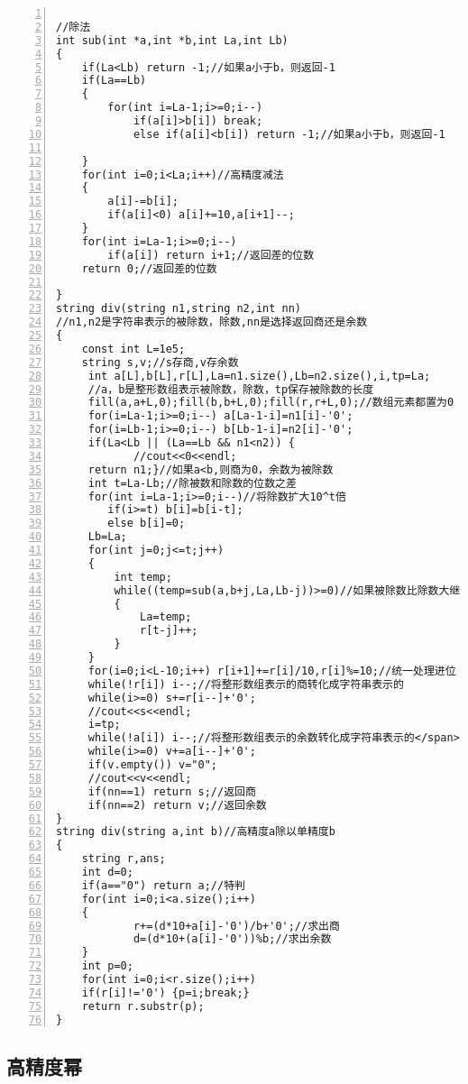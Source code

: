 \begin{lstlisting}[language={[ANSI]C},numbers=left]

//除法
int sub(int *a,int *b,int La,int Lb)
{
    if(La<Lb) return -1;//如果a小于b，则返回-1
    if(La==Lb)
    {
        for(int i=La-1;i>=0;i--)
            if(a[i]>b[i]) break;
            else if(a[i]<b[i]) return -1;//如果a小于b，则返回-1

    }
    for(int i=0;i<La;i++)//高精度减法
    {
        a[i]-=b[i];
        if(a[i]<0) a[i]+=10,a[i+1]--;
    }
    for(int i=La-1;i>=0;i--)
        if(a[i]) return i+1;//返回差的位数
    return 0;//返回差的位数

}
string div(string n1,string n2,int nn)
//n1,n2是字符串表示的被除数，除数,nn是选择返回商还是余数
{
    const int L=1e5;
    string s,v;//s存商,v存余数
     int a[L],b[L],r[L],La=n1.size(),Lb=n2.size(),i,tp=La;
     //a，b是整形数组表示被除数，除数，tp保存被除数的长度
     fill(a,a+L,0);fill(b,b+L,0);fill(r,r+L,0);//数组元素都置为0
     for(i=La-1;i>=0;i--) a[La-1-i]=n1[i]-'0';
     for(i=Lb-1;i>=0;i--) b[Lb-1-i]=n2[i]-'0';
     if(La<Lb || (La==Lb && n1<n2)) {
            //cout<<0<<endl;
     return n1;}//如果a<b,则商为0，余数为被除数
     int t=La-Lb;//除被数和除数的位数之差
     for(int i=La-1;i>=0;i--)//将除数扩大10^t倍
        if(i>=t) b[i]=b[i-t];
        else b[i]=0;
     Lb=La;
     for(int j=0;j<=t;j++)
     {
         int temp;
         while((temp=sub(a,b+j,La,Lb-j))>=0)//如果被除数比除数大继续减
         {
             La=temp;
             r[t-j]++;
         }
     }
     for(i=0;i<L-10;i++) r[i+1]+=r[i]/10,r[i]%=10;//统一处理进位
     while(!r[i]) i--;//将整形数组表示的商转化成字符串表示的
     while(i>=0) s+=r[i--]+'0';
     //cout<<s<<endl;
     i=tp;
     while(!a[i]) i--;//将整形数组表示的余数转化成字符串表示的</span>
     while(i>=0) v+=a[i--]+'0';
     if(v.empty()) v="0";
     //cout<<v<<endl;
     if(nn==1) return s;//返回商
     if(nn==2) return v;//返回余数
}
string div(string a,int b)//高精度a除以单精度b
{
    string r,ans;
    int d=0;
    if(a=="0") return a;//特判
    for(int i=0;i<a.size();i++)
    {
            r+=(d*10+a[i]-'0')/b+'0';//求出商
            d=(d*10+(a[i]-'0'))%b;//求出余数
    }
    int p=0;
    for(int i=0;i<r.size();i++)
    if(r[i]!='0') {p=i;break;}
    return r.substr(p);
}
\end{lstlisting}

\subsection{高精度幂}

